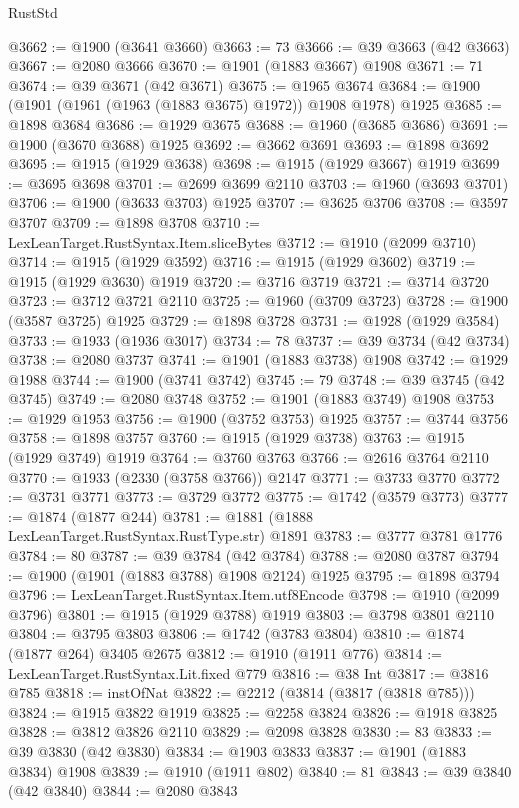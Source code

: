 \begin{lexlean}{RustStd}
\begin{coremodule}
{\begin{coremodule}
{{{{{{{{{{{{{{{{{{{{{{{{{{{{{{{{{{{{{{{{{{{@3662 := @1900 (@3641 @3660)
@3663 := 73
@3666 := @39 @3663 (@42 @3663)
@3667 := @2080 @3666
@3670 := @1901 (@1883 @3667) @1908
@3671 := 71
@3674 := @39 @3671 (@42 @3671)
@3675 := @1965 @3674
@3684 := @1900 (@1901 (@1961 (@1963 (@1883 @3675) @1972)) @1908 @1978) @1925
@3685 := @1898 @3684
@3686 := @1929 @3675
@3688 := @1960 (@3685 @3686)
@3691 := @1900 (@3670 @3688) @1925
@3692 := @3662 @3691
@3693 := @1898 @3692
@3695 := @1915 (@1929 @3638)
@3698 := @1915 (@1929 @3667) @1919
@3699 := @3695 @3698
@3701 := @2699 @3699 @2110
@3703 := @1960 (@3693 @3701)
@3706 := @1900 (@3633 @3703) @1925
@3707 := @3625 @3706
@3708 := @3597 @3707
@3709 := @1898 @3708
@3710 := LexLeanTarget.RustSyntax.Item.sliceBytes
@3712 := @1910 (@2099 @3710)
@3714 := @1915 (@1929 @3592)
@3716 := @1915 (@1929 @3602)
@3719 := @1915 (@1929 @3630) @1919
@3720 := @3716 @3719
@3721 := @3714 @3720
@3723 := @3712 @3721 @2110
@3725 := @1960 (@3709 @3723)
@3728 := @1900 (@3587 @3725) @1925
@3729 := @1898 @3728
@3731 := @1928 (@1929 @3584)
@3733 := @1933 (@1936 @3017)
@3734 := 78
@3737 := @39 @3734 (@42 @3734)
@3738 := @2080 @3737
@3741 := @1901 (@1883 @3738) @1908
@3742 := @1929 @1988
@3744 := @1900 (@3741 @3742)
@3745 := 79
@3748 := @39 @3745 (@42 @3745)
@3749 := @2080 @3748
@3752 := @1901 (@1883 @3749) @1908
@3753 := @1929 @1953
@3756 := @1900 (@3752 @3753) @1925
@3757 := @3744 @3756
@3758 := @1898 @3757
@3760 := @1915 (@1929 @3738)
@3763 := @1915 (@1929 @3749) @1919
@3764 := @3760 @3763
@3766 := @2616 @3764 @2110
@3770 := @1933 (@2330 (@3758 @3766)) @2147
@3771 := @3733 @3770
@3772 := @3731 @3771
@3773 := @3729 @3772
@3775 := @1742 (@3579 @3773)
@3777 := @1874 (@1877 @244)
@3781 := @1881 (@1888 LexLeanTarget.RustSyntax.RustType.str) @1891
@3783 := @3777 @3781 @1776
@3784 := 80
@3787 := @39 @3784 (@42 @3784)
@3788 := @2080 @3787
@3794 := @1900 (@1901 (@1883 @3788) @1908 @2124) @1925
@3795 := @1898 @3794
@3796 := LexLeanTarget.RustSyntax.Item.utf8Encode
@3798 := @1910 (@2099 @3796)
@3801 := @1915 (@1929 @3788) @1919
@3803 := @3798 @3801 @2110
@3804 := @3795 @3803
@3806 := @1742 (@3783 @3804)
@3810 := @1874 (@1877 @264) @3405 @2675
@3812 := @1910 (@1911 @776)
@3814 := LexLeanTarget.RustSyntax.Lit.fixed @779
@3816 := @38 Int
@3817 := @3816 @785
@3818 := instOfNat
@3822 := @2212 (@3814 (@3817 (@3818 @785)))
@3824 := @1915 @3822 @1919
@3825 := @2258 @3824
@3826 := @1918 @3825
@3828 := @3812 @3826 @2110
@3829 := @2098 @3828
@3830 := 83
@3833 := @39 @3830 (@42 @3830)
@3834 := @1903 @3833
@3837 := @1901 (@1883 @3834) @1908
@3839 := @1910 (@1911 @802)
@3840 := 81
@3843 := @39 @3840 (@42 @3840)
@3844 := @2080 @3843
}}}}}}}}}}}}}}}}}}}}}}}}}}}}}}}}}}}}}}}}}}}
\end{coremodule}}
\end{coremodule}
\end{lexlean}
